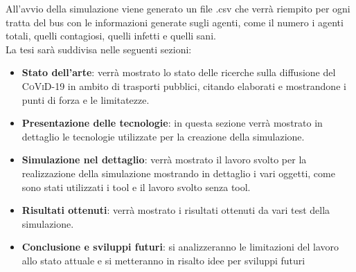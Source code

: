 \documentclass[12pt, openany]{book}
\begin{document}
		All'avvio della simulazione viene generato un file .csv che verrà riempito per ogni tratta del bus con le informazioni generate sugli agenti, come il numero i agenti totali, quelli contagiosi, quelli infetti e quelli sani.
		\\
		La tesi sarà suddivisa nelle seguenti sezioni:
		\begin{itemize}
			\item \textbf{Stato dell'arte}: verrà mostrato lo stato delle ricerche sulla diffusione del \textsc{CoViD-19} in ambito di trasporti pubblici, citando elaborati e mostrandone i punti di forza e le limitatezze.
			\item \textbf{Presentazione delle tecnologie}: in questa sezione verrà mostrato in dettaglio le tecnologie utilizzate per la creazione della simulazione.
			\item\textbf{Simulazione nel dettaglio}: verrà mostrato il lavoro svolto per la realizzazione della simulazione mostrando in dettaglio i vari oggetti, come sono stati utilizzati i tool e il lavoro svolto senza tool.
			\item\textbf{Risultati ottenuti}: verrà mostrato i risultati ottenuti da vari test della simulazione.
			\item\textbf{Conclusione e sviluppi futuri}: si analizzeranno le limitazioni del lavoro allo stato attuale e si metteranno in risalto idee per sviluppi futuri
		\end{itemize}
\end{document}
